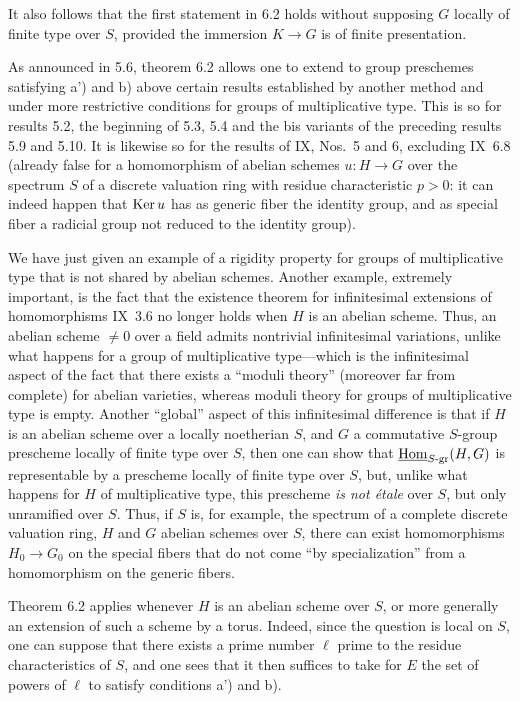 It also follows that the first statement in 6.2 holds without supposing $G$ locally of finite type over $S$, provided the immersion $K\to G$ is of finite presentation.

As announced in 5.6, theorem 6.2 allows one to extend to group preschemes satisfying a') and b) above certain results established by another method and under more restrictive conditions for groups of multiplicative type. This is so for results 5.2, the beginning of 5.3, 5.4 and the bis variants of the preceding results 5.9 and 5.10. It is likewise so for the results of IX, Nos.~5 and 6, excluding IX~6.8 (already false for a homomorphism of abelian schemes $u:H\to G$ over the spectrum $S$ of a discrete valuation ring with residue characteristic $p>0$: it can indeed happen that $\operatorname{Ker} u$ has as generic fiber the identity group, and as special fiber a radicial group not reduced to the identity group).

We have just given an example of a rigidity property for groups of multiplicative type that is not shared by abelian schemes. Another example, extremely important, is the fact that the existence theorem for infinitesimal extensions of homomorphisms IX~3.6 no longer holds when $H$ is an abelian scheme. Thus, an abelian scheme $\ne0$ over a field admits nontrivial infinitesimal variations, unlike what happens for a group of multiplicative type---which is the infinitesimal aspect of the fact that there exists a ``moduli theory'' (moreover far from complete) for abelian varieties, whereas moduli theory for groups of multiplicative type is empty. Another ``global'' aspect of this infinitesimal difference is that if $H$ is an abelian scheme over a locally noetherian $S$, and $G$ a commutative $S$-group prescheme locally of finite type over $S$, then one can show that $\underline{\operatorname{Hom}}_{S\text{-gr}}(H,G)$ is representable by a prescheme locally of finite type over $S$, but, unlike what happens for $H$ of multiplicative type, this prescheme \emph{is not étale} over $S$, but only unramified over $S$. Thus, if $S$ is, for example, the spectrum of a complete discrete valuation ring, $H$ and $G$ abelian schemes over $S$, there can exist homomorphisms $H_0\to G_0$ on the special fibers that do not come ``by specialization'' from a homomorphism on the generic fibers.

Theorem 6.2 applies whenever $H$ is an abelian scheme over $S$, or more generally an extension of such a scheme by a torus. Indeed, since the question is local on $S$, one can suppose that there exists a prime number $\ell$ prime to the residue characteristics of $S$, and one sees that it then suffices to take for $E$ the set of powers of $\ell$ to satisfy conditions a') and b).

